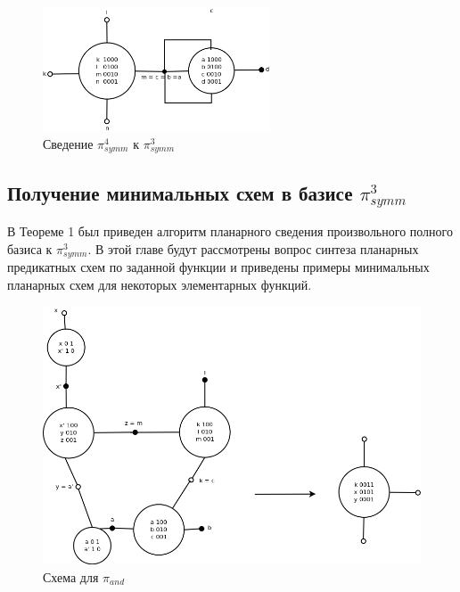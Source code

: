 \documentclass[12pt]{article}
\begin{document}
\begin{figure}[htb]
 \centering
\includegraphics[width=0.6\textwidth]{4to3.png}
\caption{Сведение $\pi_{symm}^4$ к $\pi_{symm}^3$ }
\label{fig:4to3}
\end{figure}



\clearpage
\subsection{Получение минимальных схем в базисе $\pi_{symm}^3$}
В Теореме 1 был приведен алгоритм планарного сведения произвольного полного базиса к $\pi_{symm}^3$. 
В этой главе будут рассмотрены вопрос синтеза планарных предикатных схем по заданной функции и 
приведены примеры минимальных планарных схем для некоторых элементарных функций.


\begin{figure}[htb]
\centering
\includegraphics[width=1.0\textwidth]{min_and.png}
\caption{Схема для $\pi_{and}$}
\label{fig:and}
\end{figure}
\end{document}
